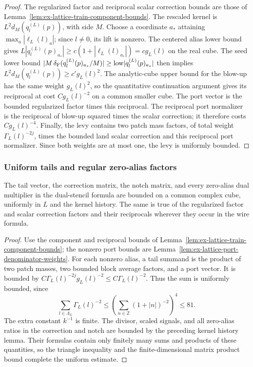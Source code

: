 \begin{proof}
The regularized factor and reciprocal scalar correction bounds are those of
Lemma~\ref{lem:ex-lattice-train-component-bounds}.
The rescaled kernel is $L^2d_M(q_l^{(L)}(p))$, with side $M$. Choose a coordinate $a_*$ attaining
$\max_a|\ell_L(l)_a|$; since $l\ne0$, its lift is nonzero. The centered
alias lower bound gives
$L|q_l^{(L)}(p)_{a_*}|\geq c(1+|\ell_L(l)_{a_*}|)=cg_L(l)$
on the real cube. The seed lower bound
$|M\,\delta_{\rm F}(q_l^{(L)}(p)_{a_*}/M)|\geq
\mathrm{low}|q_l^{(L)}(p)_{a_*}|$ then implies
$L^2d_M(q_l^{(L)}(p))\geq c' g_L(l)^2$. The analytic-cube upper bound for the
blow-up has the same weight $g_L(l)^2$, so the quantitative continuation
argument gives its reciprocal at cost $Cg_L(l)^{-2}$ on a common smaller
cube. The port vector is the bounded regularized factor times this reciprocal. The
reciprocal port normalizer is the reciprocal of blow-up squared times the
scalar correction; it therefore costs $Cg_L(l)^{-4}$. Finally, the levy contains two
patch mass factors, of total weight $\Gamma_L(l)^{-2j}$, times the bounded
land scalar correction and this reciprocal port normalizer. Since both weights are at
most one, the levy is uniformly bounded.
\end{proof}

\subsubsection{Uniform tails and regular zero-alias factors}

\begin{lemma}
\label{lem:ex-lattice-tail-notch-weights}
The tail vector, the correction matrix, the notch matrix, and every
zero-alias dual multiplier in the dual-stencil formula are bounded on a
common complex cube, uniformly in $L$ and the kernel history. The same is true of
the regularized factor and scalar correction factors and their reciprocals wherever they occur in the
wire formula.
\end{lemma}

\begin{proof}
Use the component and reciprocal bounds of
Lemma~\ref{lem:ex-lattice-train-component-bounds}; the nonzero port bounds
are Lemma~\ref{lem:ex-lattice-port-denominator-weights}. For each nonzero
alias, a tail summand is the product of two patch masses, two bounded block average
factors, and a port vector. It is bounded by
$C\Gamma_L(l)^{-2j}g_L(l)^{-2}\leq C\Gamma_L(l)^{-2}$. Thus the sum is
uniformly bounded, since
\[
 \sum_{l\in\Lambda_L}\Gamma_L(l)^{-2}
 \leq\left(\sum_{n\in\mathbb Z}(1+|n|)^{-2}\right)^4\leq81.
\]
The extra constant $k^{-1}$ is finite. The divisor, scaled signals, and
all zero-alias ratios in the correction and notch are bounded by the
preceding kernel history lemma. Their formulas contain only finitely many sums and
products of these quantities, so the triangle inequality and the
finite-dimensional matrix product bound complete the uniform estimate.
\end{proof}


